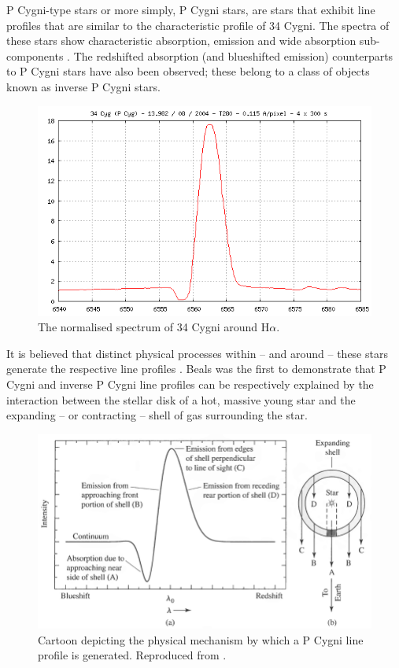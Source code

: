 P Cygni-type stars or more simply, P Cygni stars, are stars that exhibit line profiles that are similar to the characteristic profile of 34 Cygni. The spectra of these stars show characteristic absorption, emission and wide absorption sub-components \citep{zhang2021catalog}. The redshifted absorption (and blueshifted emission) counterparts to P Cygni stars have also been observed; these  belong to a class of objects known as inverse P Cygni stars. %

\begin{figure}[!htb]
\centering
\includegraphics[scale=.40]{figures/34cygni.png}
\caption{The normalised spectrum of 34 Cygni around H$\alpha$.}
\end{figure}

It is believed that distinct physical processes within -- and around -- these stars generate the respective line profiles \citep{hou2016catalog}. Beals \citeyear{1953PDAO....9....1B} was the first to demonstrate that P Cygni and inverse P Cygni line profiles can be respectively explained by the interaction between the stellar disk of a hot, massive young star and the expanding -- or contracting -- shell of gas surrounding the star. 

\begin{figure}[!htb]
\centering
\includegraphics[scale=.35]{figures/expandingpcygni.png}
\caption{Cartoon depicting the physical mechanism by which a P Cygni line profile is generated. Reproduced from \citet{kasai2013type}.}
\label{fig1.2}
\end{figure}

